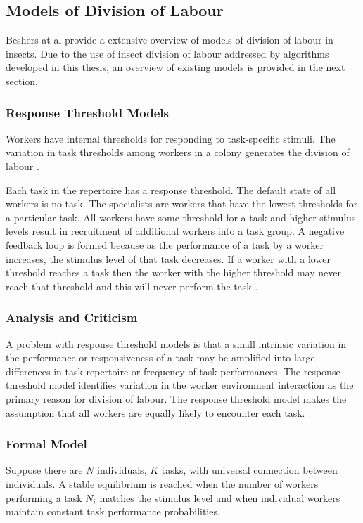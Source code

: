 \subsection{Models of Division of Labour}

Beshers at al \cite{beshers2001models} provide a extensive overview of models of division of labour in insects. Due to the use of insect division of labour addressed by algorithms developed in this thesis, an overview of existing models is provided in the next section.

\subsubsection{Response Threshold Models}

Workers have internal thresholds for responding to task-specific stimuli. The variation in task thresholds among workers in a colony generates the division of labour \cite{robinson1992regulation}. %

Each task in the repertoire has a response threshold. The default state of all workers is no task. The specialists are workers that have the lowest thresholds for a particular task. All workers have some threshold for a task and higher stimulus levels result in recruitment of additional workers into a task group. A negative feedback loop is formed because as the performance of a task by a worker increases, the stimulus level of that task decreases. If a worker with a lower threshold reaches a task then the worker with the higher threshold may never reach that threshold and this will never perform the task \cite{beshers2001models}.

\subsubsection{Analysis and Criticism}

A problem with response threshold models is that a small intrinsic variation in the performance or responsiveness of a task may be amplified into large differences in task repertoire or frequency of task performances. The response threshold model identifies variation in the worker environment interaction as the primary reason for division of labour. The response threshold model makes the assumption that all workers are equally likely to encounter each task.
  
\subsubsection{Formal Model}
Suppose there are $N$ individuals, $K$ tasks, with universal connection between individuals. 
A stable equilibrium is reached when the number of workers performing a task $N_i$ matches the stimulus level and when individual workers maintain constant task performance probabilities. \cite{page1990self}

